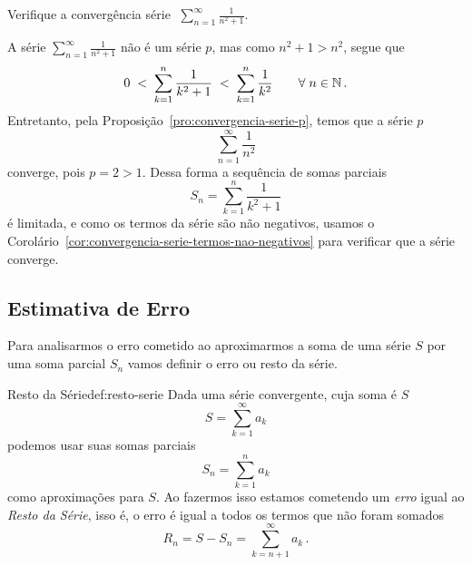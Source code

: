 \begin{example}
  Verifique a convergência série
  \(\;
    \sum_{n=1}^\infty \frac{1}{n^2+1}
  \).

  \solution
  A série \(\sum_{n=1}^\infty \frac{1}{n^2+1}\) não é um série $p$,
  mas como $n^2+1>n^2$, segue que
  \[
      0 \;<\;\sum_{k=1}^n \frac{1}{k^2+1}
        \;<\; \sum_{k=1}^n \frac{1}{k^2}
      \qquad \forall\; n\in \mathbb{N}          \,.
  \]
  Entretanto, pela Proposição~\ref{pro:convergencia-serie-p}, temos que a série $p$
  \[
    \sum_{n=1}^\infty \frac{1}{n^2}
  \]
  converge, pois $p=2>1$. Dessa forma a sequência de somas parciais
  \[
    S_n=\sum_{k=1}^n \frac{1}{k^2+1}
  \]
  é limitada, e como os termos da série são não negativos,
  usamos o Corolário~\ref{cor:convergencia-serie-termos-nao-negativos}
  para verificar que a série converge.
\end{example}


\subsection*{Estimativa de Erro}

Para analisarmos o erro cometido ao aproximarmos a soma de uma série $S$
por uma soma parcial $S_n$ vamos definir o erro ou resto da série.

\begin{definicao}{Resto da Série}{def:resto-serie}
  Dada uma série convergente, cuja soma é $S$
  \[
    S = \sum_{k=1}^\infty a_k
  \]
  podemos usar suas somas parciais
  \[
    S_n = \sum_{k=1}^n a_k
  \]
  como aproximações para $S$. Ao fazermos isso estamos cometendo
  um \emph{erro} igual ao \emph{Resto da Série},
  isso é, o erro é igual a todos os termos que não foram somados
  \[
    R_n = S-S_n
        = \sum_{k=n+1}^\infty a_k       \,.
  \]
\end{definicao}

